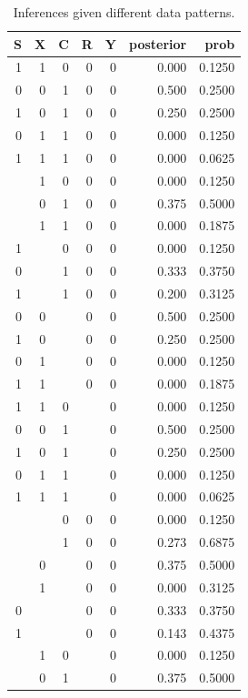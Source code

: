 \documentclass[
  12pt,
]{book}
\begin{document}
\begin{table}

\caption{\label{tab:showstrats5xx}Inferences given different data patterns. }
\centering
\begin{tabular}[t]{r|r|r|r|r|r|r}
\hline
S & X & C & R & Y & posterior & prob\\
\hline
1 & 1 & 0 & 0 & 0 & 0.000 & 0.1250\\
\hline
0 & 0 & 1 & 0 & 0 & 0.500 & 0.2500\\
\hline
1 & 0 & 1 & 0 & 0 & 0.250 & 0.2500\\
\hline
0 & 1 & 1 & 0 & 0 & 0.000 & 0.1250\\
\hline
1 & 1 & 1 & 0 & 0 & 0.000 & 0.0625\\
\hline
 & 1 & 0 & 0 & 0 & 0.000 & 0.1250\\
\hline
 & 0 & 1 & 0 & 0 & 0.375 & 0.5000\\
\hline
 & 1 & 1 & 0 & 0 & 0.000 & 0.1875\\
\hline
1 &  & 0 & 0 & 0 & 0.000 & 0.1250\\
\hline
0 &  & 1 & 0 & 0 & 0.333 & 0.3750\\
\hline
1 &  & 1 & 0 & 0 & 0.200 & 0.3125\\
\hline
0 & 0 &  & 0 & 0 & 0.500 & 0.2500\\
\hline
1 & 0 &  & 0 & 0 & 0.250 & 0.2500\\
\hline
0 & 1 &  & 0 & 0 & 0.000 & 0.1250\\
\hline
1 & 1 &  & 0 & 0 & 0.000 & 0.1875\\
\hline
1 & 1 & 0 &  & 0 & 0.000 & 0.1250\\
\hline
0 & 0 & 1 &  & 0 & 0.500 & 0.2500\\
\hline
1 & 0 & 1 &  & 0 & 0.250 & 0.2500\\
\hline
0 & 1 & 1 &  & 0 & 0.000 & 0.1250\\
\hline
1 & 1 & 1 &  & 0 & 0.000 & 0.0625\\
\hline
 &  & 0 & 0 & 0 & 0.000 & 0.1250\\
\hline
 &  & 1 & 0 & 0 & 0.273 & 0.6875\\
\hline
 & 0 &  & 0 & 0 & 0.375 & 0.5000\\
\hline
 & 1 &  & 0 & 0 & 0.000 & 0.3125\\
\hline
0 &  &  & 0 & 0 & 0.333 & 0.3750\\
\hline
1 &  &  & 0 & 0 & 0.143 & 0.4375\\
\hline
 & 1 & 0 &  & 0 & 0.000 & 0.1250\\
\hline
 & 0 & 1 &  & 0 & 0.375 & 0.5000\\

\end{tabular}
\end{table}
\end{document}
